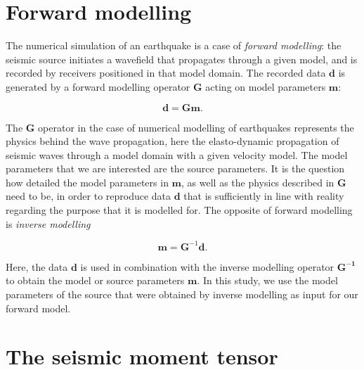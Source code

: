 \documentclass[../Text/00main.tex]{subfiles}
\begin{document}
\section{Forward modelling}

The numerical simulation of an earthquake is a case of \textit{forward modelling}: the seismic source initiates a wavefield that propagates through a given model, and is recorded by receivers positioned in that model domain. The recorded data $\textbf{d}$ is generated by a forward modelling operator $\textbf{G}$ acting on model parameters $\textbf{m}$:

\begin{equation}
    \textbf{d} = \textbf{G}\textbf{m}.
\end{equation}

The $\textbf{G}$ operator in the case of numerical modelling of earthquakes represents the physics behind the wave propagation, here the elasto-dynamic propagation of seismic waves through a model domain with a given velocity model. The model parameters that we are interested are the source parameters. It is the question how detailed the model parameters in $\textbf{m}$, as well as the physics described in $\mathbf{G}$ need to be, in order to reproduce data $\mathbf{d}$ that is sufficiently in line with reality regarding the purpose that it is modelled for. The opposite of forward modelling is \textit{inverse modelling}

\begin{equation}
    \textbf{m} = \textbf{G}^{-1} \textbf{d}.
\end{equation}

Here, the data $\mathbf{d}$ is used in combination with the inverse modelling operator $\mathbf{G^{-1}}$ to obtain the model or source parameters $\mathbf{m}$. In this study, we use the model parameters of the source that were obtained by inverse modelling as input for our forward model. 


\section{The seismic moment tensor}\label{sec:CMTexplanation}
\end{document}
